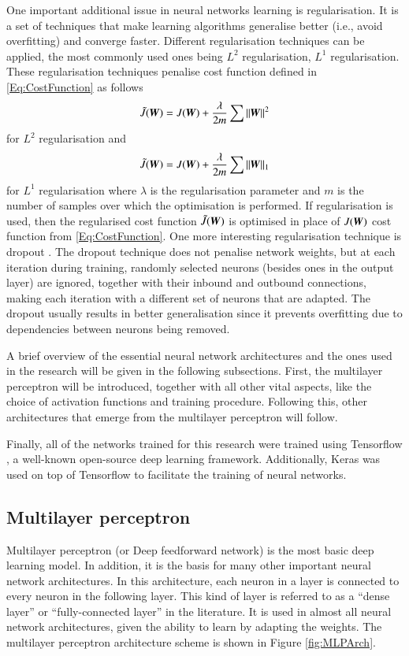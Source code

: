 One important additional issue in neural networks learning is regularisation. It is a set of techniques that make learning algorithms generalise better (i.e., avoid overfitting) and converge faster. Different regularisation techniques can be applied, the most commonly used ones being $L^2$ regularisation, $L^1$ regularisation. These regularisation techniques penalise cost function defined in \cref{Eq:CostFunction} as follows
\[
    \tilde{J}({\bm{W}})=J({\bm{W}})+\frac{\lambda}{2m}\sum\|{\bm{W}}\|^2
\]
for $L^2$ regularisation and
\[
    \tilde{J}({\bm{W}})=J({\bm{W}})+\frac{\lambda}{2m}\sum\|{\bm{W}}\|_1
\]
for $L^1$ regularisation where $\lambda$ is the regularisation parameter and $m$ is the number of samples over which the optimisation is performed. If regularisation is used, then the regularised cost function $\tilde{J}({\bm{W}})$ is optimised in place of $J({\bm{W}})$ cost function from \cref{Eq:CostFunction}. One more interesting regularisation technique is dropout \cite{Srivastava2014}. The dropout technique does not penalise network weights, but at each iteration during training, randomly selected neurons (besides ones in the output layer) are ignored, together with their inbound and outbound connections, making each iteration with a different set of neurons that are adapted. The dropout usually results in better generalisation since it prevents overfitting due to dependencies between neurons being removed.

A brief overview of the essential neural network architectures and the ones used in the research will be given in the following subsections. First, the multilayer perceptron will be introduced, together with all other vital aspects, like the choice of activation functions and training procedure. Following this, other architectures that emerge from the multilayer perceptron will follow. 

Finally, all of the networks trained for this research were trained using Tensorflow \cite{Abadi2015}, a well-known open-source deep learning framework. Additionally, Keras \cite{Chollet2015} was used on top of Tensorflow to facilitate the training of neural networks.

\subsection{Multilayer perceptron}
\label{sec:MLP}

Multilayer perceptron (or Deep feedforward network) is the most basic deep learning model. In addition, it is the basis for many other important neural network architectures. In this architecture, each neuron in a layer is connected to every neuron in the following layer. This kind of layer is referred to as a ``dense layer'' or ``fully-connected layer'' in the literature. It is used in almost all neural network architectures, given the ability to learn by adapting the weights. The multilayer perceptron architecture scheme is shown in Figure \ref{fig:MLPArch}.

